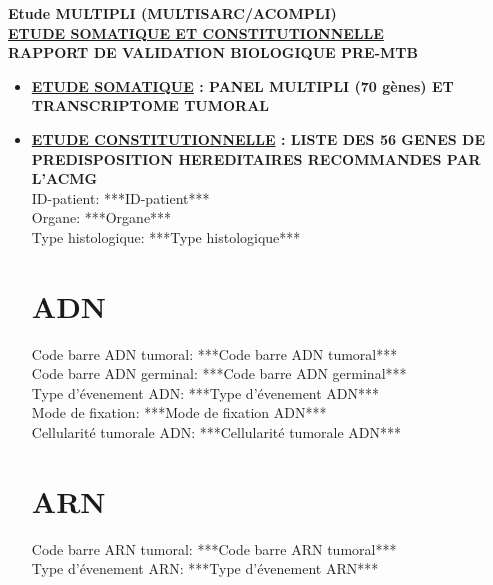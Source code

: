 \documentclass[10pt]{article}
\begin{document}
\begin{center}
\textbf{\large Etude MULTIPLI (MULTISARC/ACOMPLI)}\\ 
\textbf{\large \underline{ETUDE SOMATIQUE ET CONSTITUTIONNELLE}}\\
\bigbreak
\textbf{\Large RAPPORT DE VALIDATION BIOLOGIQUE PRE-MTB}\\
\end{center}
\bigskip
\begin{itemize}[font=\Large, label=, leftmargin=*, wide = 0pt]
\item \textbf{\underline{ETUDE SOMATIQUE} : PANEL MULTIPLI (70 gènes) ET TRANSCRIPTOME TUMORAL}\\
\item \textbf{\underline{ETUDE CONSTITUTIONNELLE} : LISTE DES 56 GENES DE PREDISPOSITION HEREDITAIRES RECOMMANDES PAR L’ACMG}\\

ID-patient: ***ID-patient***\\

Organe: ***Organe***\\

Type histologique: ***Type histologique***

\section*{ADN}

Code barre ADN tumoral: ***Code barre ADN tumoral*** \\

Code barre ADN germinal: ***Code barre ADN germinal*** \\

Type d'évenement ADN: ***Type d'évenement ADN***\\

Mode de fixation: ***Mode de fixation ADN***\\

Cellularité tumorale ADN: ***Cellularité tumorale ADN***

\section*{ARN}

Code barre ARN tumoral: ***Code barre ARN tumoral*** \\

Type d'évenement ARN: ***Type d'évenement ARN***\\


\end{itemize}
\end{document}
